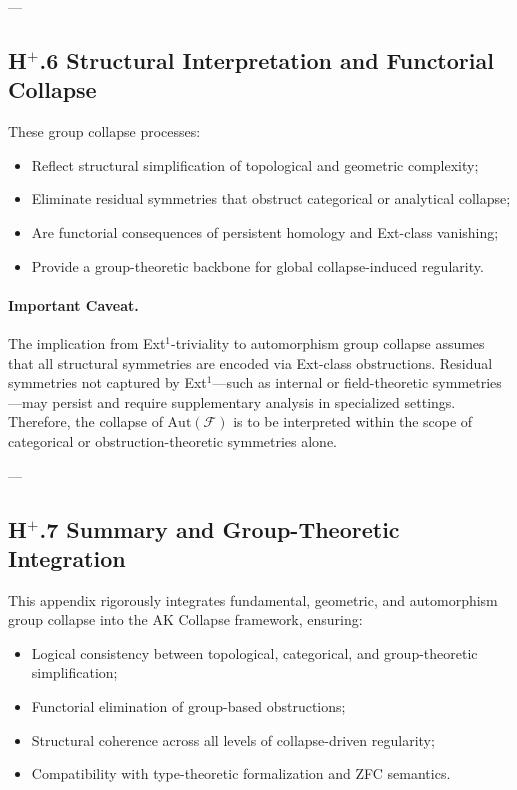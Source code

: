 \documentclass[11pt]{article}
\begin{document}
---

\subsection*{H$^{+}$.6 Structural Interpretation and Functorial Collapse}

These group collapse processes:

\begin{itemize}
    \item Reflect structural simplification of topological and geometric complexity;
    \item Eliminate residual symmetries that obstruct categorical or analytical collapse;
    \item Are functorial consequences of persistent homology and Ext-class vanishing;
    \item Provide a group-theoretic backbone for global collapse-induced regularity.
\end{itemize}

\paragraph{Important Caveat.}
The implication from Ext$^1$-triviality to automorphism group collapse assumes that all structural symmetries are encoded via Ext-class obstructions. Residual symmetries not captured by Ext$^1$—such as internal or field-theoretic symmetries—may persist and require supplementary analysis in specialized settings. Therefore, the collapse of $\mathrm{Aut}(\mathcal{F})$ is to be interpreted within the scope of categorical or obstruction-theoretic symmetries alone.

---

\subsection*{H$^{+}$.7 Summary and Group-Theoretic Integration}

This appendix rigorously integrates fundamental, geometric, and automorphism group collapse into the AK Collapse framework, ensuring:

\begin{itemize}
    \item Logical consistency between topological, categorical, and group-theoretic simplification;
    \item Functorial elimination of group-based obstructions;
    \item Structural coherence across all levels of collapse-driven regularity;
    \item Compatibility with type-theoretic formalization and ZFC semantics.
\end{itemize}
\end{document}
